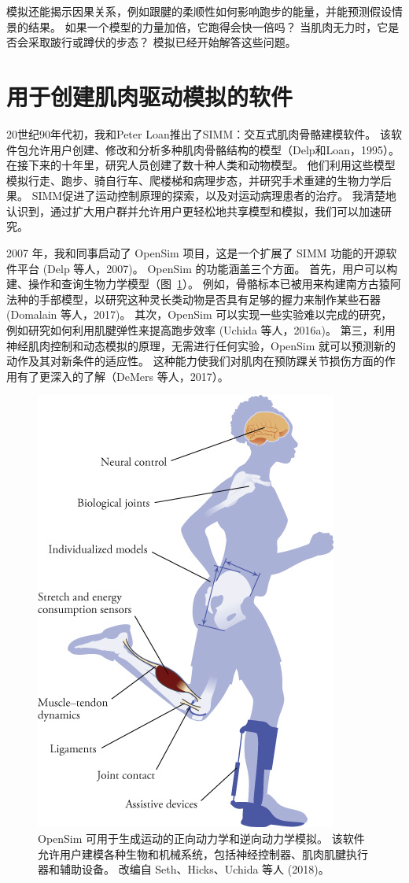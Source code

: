 模拟还能揭示因果关系，例如跟腱的柔顺性如何影响跑步的能量，并能预测假设情景的结果。
如果一个模型的力量加倍，它跑得会快一倍吗？
当肌肉无力时，它是否会采取跛行或蹲伏的步态？
模拟已经开始解答这些问题。


\section{用于创建肌肉驱动模拟的软件}

20世纪90年代初，我和Peter Loan推出了SIMM：交互式肌肉骨骼建模软件。
该软件包允许用户创建、修改和分析多种肌肉骨骼结构的模型（Delp和Loan，1995）。
在接下来的十年里，研究人员创建了数十种人类和动物模型。
他们利用这些模型模拟行走、跑步、骑自行车、爬楼梯和病理步态，并研究手术重建的生物力学后果。
SIMM促进了运动控制原理的探索，以及对运动病理患者的治疗。
我清楚地认识到，通过扩大用户群并允许用户更轻松地共享模型和模拟，我们可以加速研究。


2007 年，我和同事启动了 OpenSim 项目，这是一个扩展了 SIMM 功能的开源软件平台 (Delp 等人，2007)。
OpenSim 的功能涵盖三个方面。
首先，用户可以构建、操作和查询生物力学模型（图~\ref{fig:10_14}）。
例如，骨骼标本已被用来构建南方古猿阿法种的手部模型，以研究这种灵长类动物是否具有足够的握力来制作某些石器 (Domalain 等人，2017)。
其次，OpenSim 可以实现一些实验难以完成的研究，例如研究如何利用肌腱弹性来提高跑步效率 (Uchida 等人，2016a)。
第三，利用神经肌肉控制和动态模拟的原理，无需进行任何实验，OpenSim 就可以预测新的动作及其对新条件的适应性。
这种能力使我们对肌肉在预防踝关节损伤方面的作用有了更深入的了解（DeMers 等人，2017）。


\begin{figure}[!htb]
	\centering
	\includegraphics[width=0.7\linewidth]{chap10/10_14}
	\caption{OpenSim 可用于生成运动的正向动力学和逆向动力学模拟。
		该软件允许用户建模各种生物和机械系统，包括神经控制器、肌肉肌腱执行器和辅助设备。
		改编自 Seth、Hicks、Uchida 等人 (2018)。 \label{fig:10_14}}
\end{figure}


